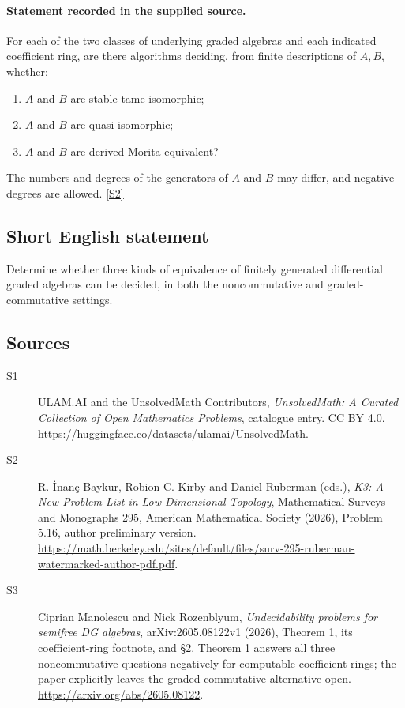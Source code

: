 \documentclass[11pt]{article}
\newcommand{\sref}[2]{\hyperlink{source:#1:#2}{[S#2]}}
\begin{document}
\paragraph{Statement recorded in the supplied source.}
For each of the two classes of underlying graded algebras and each indicated coefficient ring, are there algorithms deciding, from finite descriptions of $A,B$, whether:
\begin{enumerate}
\item[(a)] $A$ and $B$ are stable tame isomorphic;
\item[(b)] $A$ and $B$ are quasi-isomorphic;
\item[(c)] $A$ and $B$ are derived Morita equivalent?
\end{enumerate}
The numbers and degrees of the generators of $A$ and $B$ may differ, and negative degrees are allowed. \sref{statement}{2}
\subsection{Short English statement}
Determine whether three kinds of equivalence of finitely generated differential graded algebras can be decided, in both the noncommutative and graded-commutative settings.
\subsection{Sources}
\begin{description}
\item[\hypertarget{source:statement:1}{S1}] ULAM.AI and the UnsolvedMath Contributors, \emph{UnsolvedMath: A Curated Collection of Open Mathematics Problems}, catalogue entry. CC BY 4.0. \url{https://huggingface.co/datasets/ulamai/UnsolvedMath}.
\item[\hypertarget{source:statement:2}{S2}] R. İnanç Baykur, Robion C. Kirby and Daniel Ruberman (eds.), \emph{K3: A New Problem List in Low-Dimensional Topology}, Mathematical Surveys and Monographs 295, American Mathematical Society (2026), Problem 5.16, author preliminary version. \url{https://math.berkeley.edu/sites/default/files/surv-295-ruberman-watermarked-author-pdf.pdf}.
\item[\hypertarget{source:statement:3}{S3}] Ciprian Manolescu and Nick Rozenblyum, \emph{Undecidability problems for semifree DG algebras}, arXiv:2605.08122v1 (2026), Theorem 1, its coefficient-ring footnote, and §2. Theorem 1 answers all three noncommutative questions negatively for computable coefficient rings; the paper explicitly leaves the graded-commutative alternative open. \url{https://arxiv.org/abs/2605.08122}.
\end{description}
\label{end:statement}
\end{document}
